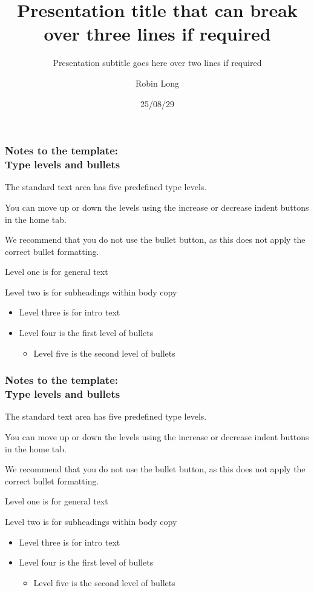 \documentclass[11pt,aspectratio=169,t]{beamer}
\title{Presentation title that can break over three lines if required}
\subtitle{Presentation subtitle goes here over two lines if required}
\date{25/08/29}
\author{Robin Long}
\institute{Digital Research Group, NCDR}
\begin{document}
\maketitle

\begin{frame}
  \frametitle{Notes to the template:\\Type levels and bullets}

  The standard text area has five predefined type levels.
    
  You can move up or down the levels using the increase or decrease indent buttons in the home tab.
  
  We recommend that you do not use the bullet button, as this does not apply the correct bullet formatting.
  
  Level one is for general text
  
  Level two is for subheadings within body copy
  
\begin{itemize}
\item Level three is for intro text
\item Level four is the first level of bullets
  \begin{itemize}
  \item Level five is the second level of bullets
  \end{itemize}
\end{itemize}
\end{frame}

\begin{frame}
  \frametitle{Notes to the template:\\Type levels and bullets}

  The standard text area has five predefined type levels.
    
  You can move up or down the levels using the increase or decrease indent buttons in the home tab.
  
  We recommend that you do not use the bullet button, as this does not apply the correct bullet formatting.
  
  Level one is for general text
  
  Level two is for subheadings within body copy
  
\begin{itemize}
\item Level three is for intro text
\item Level four is the first level of bullets
  \begin{itemize}
  \item Level five is the second level of bullets
  \end{itemize}
\end{itemize}
\end{frame}
\end{document}
